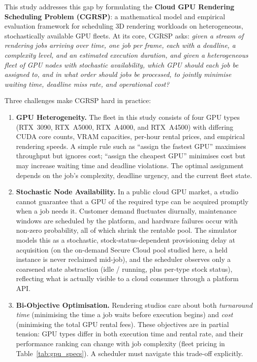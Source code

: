 This study addresses this gap by formulating the \textbf{Cloud GPU Rendering Scheduling Problem (CGRSP)}: a mathematical model and empirical evaluation framework for scheduling 3D rendering workloads on heterogeneous, stochastically available GPU fleets. At its core, CGRSP asks: \emph{given a stream of rendering jobs arriving over time, one job per frame, each with a deadline, a complexity level, and an estimated execution duration, and given a heterogeneous fleet of GPU nodes with stochastic availability, which GPU should each job be assigned to, and in what order should jobs be processed, to jointly minimise waiting time, deadline miss rate, and operational cost?}

Three challenges make CGRSP hard in practice:

\begin{enumerate}

\item \textbf{GPU Heterogeneity.} The fleet in this study consists of four GPU types (RTX~3090, RTX~A5000, RTX~A4000, and RTX~A4500) with differing CUDA core counts, VRAM capacities, per-hour rental prices, and empirical rendering speeds. A simple rule such as ``assign the fastest GPU'' maximises throughput but ignores cost; ``assign the cheapest GPU'' minimises cost but may increase waiting time and deadline violations. The optimal assignment depends on the job's complexity, deadline urgency, and the current fleet state.

\item \textbf{Stochastic Node Availability.} In a public cloud GPU market, a studio cannot guarantee that a GPU of the required type can be acquired promptly when a job needs it. Customer demand fluctuates diurnally, maintenance windows are scheduled by the platform, and hardware failures occur with non-zero probability, all of which shrink the rentable pool. The simulator models this as a stochastic, stock-status-dependent provisioning delay at acquisition (on the on-demand Secure Cloud pool studied here, a held instance is never reclaimed mid-job), and the scheduler observes only a coarsened state abstraction (idle / running, plus per-type stock status), reflecting what is actually visible to a cloud consumer through a platform API.

\item \textbf{Bi-Objective Optimisation.} Rendering studios care about both \emph{turnaround time} (minimising the time a job waits before execution begins) and \emph{cost} (minimising the total GPU rental fees). These objectives are in partial tension: GPU types differ in both execution time and rental rate, and their performance ranking can change with job complexity (fleet pricing in Table~\ref{tab:gpu_specs}). A scheduler must navigate this trade-off explicitly.

\end{enumerate}


